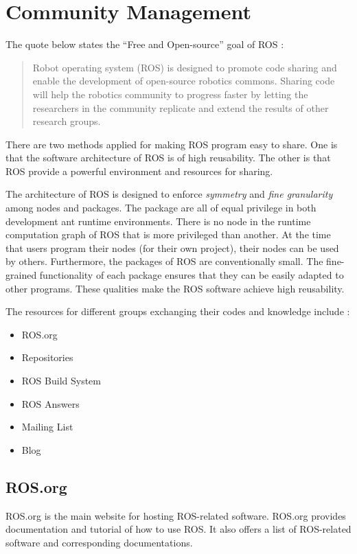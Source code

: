 \documentclass[a4paper, 10pt, conference]{ieeeconf}       %
\begin{document}
\section{Community Management}

The quote below states the ``Free and Open-source'' goal of ROS\cite{cousins_sharing_2010} :
\begin{quote}
  Robot operating system (ROS) is designed to promote code sharing and enable the development of open-source robotics commons. Sharing code will help the robotics community to progress faster by letting the researchers in the community replicate and extend the results of other research groups. 
\end{quote}

There are two methods applied for making ROS program easy to share. One is that the software architecture of ROS is of high reusability. The other is that ROS provide a powerful environment and resources for sharing.

The architecture of ROS is designed to enforce \emph{symmetry} and \emph{fine granularity} among nodes and packages. The package are all of equal privilege in both development ant runtime environments. There is no node in the runtime computation graph of ROS that is more privileged than another. At the time that users program their nodes (for their own project), their nodes can be used by others. Furthermore, the packages of ROS are conventionally small. The fine-grained functionality of each package ensures that they can be easily adapted to other programs. These qualities make the ROS software achieve high reusability.

The resources for different groups exchanging their codes and knowledge include :
\begin{itemize}
  \item ROS.org
  \item Repositories
  \item ROS Build System
  \item ROS Answers
  \item Mailing List
  \item Blog
\end{itemize}

\subsection{ROS.org}
ROS.org is the main website for hosting ROS-related software. ROS.org provides documentation and tutorial of how to use ROS. It also offers a list of ROS-related software and corresponding documentations. 
\end{document}
